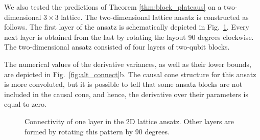 We also tested the predictions of Theorem \ref{thm:block_plateaus} on a two-dimensional $3 \times 3$ lattice. The two-dimensional lattice ansatz is constructed as follows. The first layer of the ansatz is schematically depicted in Fig.~\ref{fig:2d_ansatz_scheme}. Every next layer is obtained from the last by rotating the layout 90 degrees clockwise. The two-dimensional ansatz consisted of four layers of two-qubit blocks. 

The numerical values of the derivative variances, as well as their lower bounds, are depicted in Fig.~\ref{fig:alt_connect}b. The causal cone structure for this ansatz is more convoluted, but it is possible to tell that some ansatz blocks are not included in the causal cone, and hence, the derivative over their parameters is equal to zero. 

\begin{figure}
    \centering
    \caption{Connectivity of one layer in the 2D lattice ansatz. Other layers are formed by rotating this pattern by 90 degrees.}
    \label{fig:2d_ansatz_scheme}
\end{figure}







